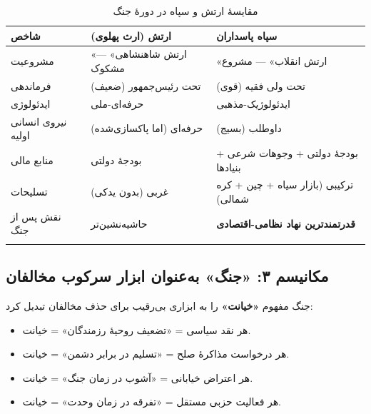 \documentclass[12pt,a4paper]{book}
\newcommand{\keyword}[1]{\textbf{\textcolor{cPrimary}{#1}}}
\begin{document}
\begin{longtable}{%
    >{\raggedleft\arraybackslash}p{}
    >{\raggedleft\arraybackslash}p{}
    >{\raggedleft\arraybackslash}p{}}
\toprule
\rowcolor{cPrimary!10}
\textbf{شاخص} & \textbf{ارتش (ارث پهلوی)} & \textbf{سپاه پاسداران} \\
\midrule
\endhead

مشروعیت &
«ارتش شاهنشاهی» — مشکوک &
«ارتش انقلاب» — مشروع \\
\midrule

فرماندهی &
تحت رئیس‌جمهور (ضعیف) &
تحت ولی فقیه (قوی) \\
\midrule

ایدئولوژی &
حرفه‌ای-ملی &
ایدئولوژیک-مذهبی \\
\midrule

نیروی انسانی اولیه &
حرفه‌ای (اما پاکسازی‌شده) &
داوطلب (بسیج) \\
\midrule

منابع مالی &
بودجهٔ دولتی &
بودجهٔ دولتی + وجوهات شرعی + بنیادها \\
\midrule

تسلیحات &
غربی (بدون یدکی) &
ترکیبی (بازار سیاه + چین + کره شمالی) \\
\midrule

نقش پس از جنگ &
حاشیه‌نشین‌تر &
\keyword{قدرتمندترین نهاد نظامی-اقتصادی} \\

\bottomrule
\caption{مقایسهٔ ارتش و سپاه در دورهٔ جنگ}
\label{tab:army-vs-irgc}
\end{longtable}

\subsection{مکانیسم ۳: «جنگ» به‌عنوان ابزار سرکوب مخالفان}

جنگ مفهوم \keyword{«خیانت»} را به ابزاری بی‌رقیب برای حذف مخالفان تبدیل کرد:

\begin{warningBox}
\begin{itemize}[label=\textcolor{cAccent}{$\blacktriangleright$}, rightmargin=2em]
    \item هر نقد سیاسی = «تضعیف روحیهٔ رزمندگان» = خیانت.
    \item هر درخواست مذاکرهٔ صلح = «تسلیم در برابر دشمن» = خیانت.
    \item هر اعتراض خیابانی = «آشوب در زمان جنگ» = خیانت.
    \item هر فعالیت حزبی مستقل = «تفرقه در زمان وحدت» = خیانت.
\end{itemize}
\end{warningBox}
\end{document}
